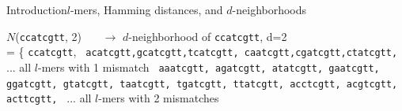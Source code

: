 \documentclass[pdf,xcolor={dvipsnames}]{beamer}
\begin{document}
\begin{frame}{Introduction}{$l$-mers, Hamming distances, and $d$-neighborhoods}
\begin{itemize}
{				{\footnotesize 
					$N$(\texttt{ccatcgtt}, 2)\ \ \ {\color{Gray} $\rightarrow$ $d$-neighborhood of \texttt{ccatcgtt}, d=2}\\
					\hspace*{0.055\textwidth}=  \{ \texttt{ccatcgtt}, \newline
					\texttt{
						\hspace*{0.1\textwidth}
						{\color{red}a}catcgtt,{\color{red}g}catcgtt,{\color{red}t}catcgtt,%
						c{\color{red}a}atcgtt,c{\color{red}g}atcgtt,c{\color{red}t}atcgtt,
					}	
					\hspace*{0.12\textwidth}...{\color{Gray} all $l$-mers with 1 mismatch}\newline
					\texttt{
						\hspace*{0.1\textwidth}
						{\color{red}a}{\color{red}a}atcgtt,%
						{\color{red}a}{\color{red}g}atcgtt,%
						{\color{red}a}{\color{red}t}atcgtt,%
						{\color{red}g}{\color{red}a}atcgtt,%
						{\color{red}g}{\color{red}g}atcgtt,%
						{\color{red}g}{\color{red}t}atcgtt,
						\hspace*{0.1\textwidth}
						{\color{red}t}{\color{red}a}atcgtt,%
						{\color{red}t}{\color{red}g}atcgtt,%
						{\color{red}t}{\color{red}t}atcgtt,%
						{\color{red}a}c{\color{red}c}tcgtt,%
						{\color{red}a}c{\color{red}g}tcgtt,%
						{\color{red}a}c{\color{red}t}tcgtt,					
				 	}
				 	\hspace*{0.12\textwidth}...{\color{Gray} all $l$-mers with 2 mismatches}\newline
				 	\hspace*{0.095\textwidth}{\footnotesize\}}
			 	}
			}
		\end{itemize}
		\end{frame}
\end{document}
